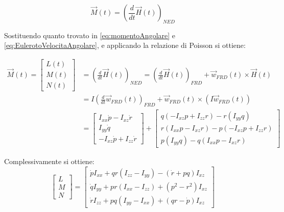 \begin{equation*}
    \vec{M}(t) = \left(\frac{d}{dt}\vec{H}(t)\right)_{NED}
\end{equation*}

Sostituendo quanto trovato in \eqref{eq:momentoAngolare} e \eqref{eq:EulerotoVelocitaAngolare}, e applicando la relazione di Poisson si ottiene:

\begin{equation*}
    \begin{split}
        \vec{M}(t) = \begin{bmatrix}
                         L(t) \\
                         M(t) \\
                         N(t)
                     \end{bmatrix} & = \left(\frac{d}{dt} \vec{H}(t)\right)_{NED} = \left(\frac{d}{d t} \vec{H}(t)\right)_{FRD} + \vec{w}_{FRD}(t)\times\vec{H}(t)
        \\ & = I\left(\frac{d}{d t} \vec{w}_{FRD}(t)\right)_{FRD} + \vec{w}_{FRD}(t)\times \left(I\vec{w}_{FRD}(t)\right)
        \\ & = \begin{bmatrix}
            I_{xx}\dot{p} - I_{xz}\dot{r} \\
            I_{yy}\dot{q}                 \\
            - I_{xz}\dot{p} + I_{zz}\dot{r}
        \end{bmatrix} + \begin{bmatrix}
            q\left(- I_{xz}p + I_{zz}r\right) - r\left(I_{yy}q\right)           \\
            r\left(I_{xx}p - I_{xz}r\right) - p\left(- I_{xz}p + I_{zz}r\right) \\
            p\left(I_{yy}q\right) - q\left(I_{xx}p - I_{xz}r\right)
        \end{bmatrix}
    \end{split}
\end{equation*}

Complessivamente si ottiene:
\begin{equation}
    \label{eq:secondaEquazioneCardinale}
    \begin{bmatrix}
        L \\
        M \\
        N
    \end{bmatrix} = \begin{bmatrix}
        \dot{p}I_{xx} + qr\left(I_{zz} - I_{yy}\right) - \left(\dot{r} + pq\right)I_{xz} \\
        \dot{q}I_{yy} + pr\left(I_{xx} - I_{zz}\right) + \left(p^2 - r^2\right)I_{xz}    \\
        \dot{r}I_{zz} + pq\left(I_{yy} - I_{xx}\right) + \left(qr - \dot{p}\right)I_{xz}
    \end{bmatrix}
\end{equation}


